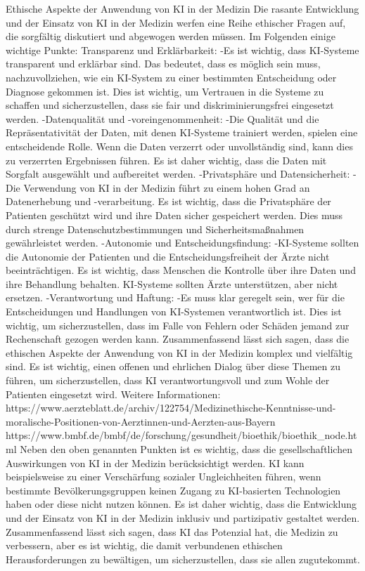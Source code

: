 \documentclass{article}
\begin{document}
{    Ethische Aspekte der Anwendung von KI in der Medizin
    Die rasante Entwicklung und der Einsatz von KI in der Medizin werfen eine Reihe ethischer Fragen auf, die sorgfältig diskutiert und abgewogen werden müssen. Im Folgenden einige wichtige Punkte:
    Transparenz und Erklärbarkeit:
    -Es ist wichtig, dass KI-Systeme transparent und erklärbar sind. Das bedeutet, dass es möglich sein muss, nachzuvollziehen, wie ein KI-System zu einer bestimmten Entscheidung oder Diagnose gekommen ist. Dies ist wichtig, um Vertrauen in die Systeme zu schaffen und sicherzustellen, dass sie fair und diskriminierungsfrei eingesetzt werden.
    -Datenqualität und -voreingenommenheit:
    -Die Qualität und die Repräsentativität der Daten, mit denen KI-Systeme trainiert werden, spielen eine entscheidende Rolle. Wenn die Daten verzerrt oder unvollständig sind, kann dies zu verzerrten Ergebnissen führen. Es ist daher wichtig, dass die Daten mit Sorgfalt ausgewählt und aufbereitet werden.
    -Privatsphäre und Datensicherheit:
    -Die Verwendung von KI in der Medizin führt zu einem hohen Grad an Datenerhebung und -verarbeitung. Es ist wichtig, dass die Privatsphäre der Patienten geschützt wird und ihre Daten sicher gespeichert werden. Dies muss durch strenge Datenschutzbestimmungen und Sicherheitsmaßnahmen gewährleistet werden.
    -Autonomie und Entscheidungsfindung:
    -KI-Systeme sollten die Autonomie der Patienten und die Entscheidungsfreiheit der Ärzte nicht beeinträchtigen. Es ist wichtig, dass Menschen die Kontrolle über ihre Daten und ihre Behandlung behalten. KI-Systeme sollten Ärzte unterstützen, aber nicht ersetzen.
    -Verantwortung und Haftung:
    -Es muss klar geregelt sein, wer für die Entscheidungen und Handlungen von KI-Systemen verantwortlich ist. Dies ist wichtig, um sicherzustellen, dass im Falle von Fehlern oder Schäden jemand zur Rechenschaft gezogen werden kann.
    Zusammenfassend lässt sich sagen, dass die ethischen Aspekte der Anwendung von KI in der Medizin komplex und vielfältig sind. Es ist wichtig, einen offenen und ehrlichen Dialog über diese Themen zu führen, um sicherzustellen, dass KI verantwortungsvoll und zum Wohle der Patienten eingesetzt wird.
    Weitere Informationen:
    https://www.aerzteblatt.de/archiv/122754/Medizinethische-Kenntnisse-und-moralische-Positionen-von-Aerztinnen-und-Aerzten-aus-Bayern
    https://www.bmbf.de/bmbf/de/forschung/gesundheit/bioethik/bioethik_node.html
    Neben den oben genannten Punkten ist es wichtig, dass die gesellschaftlichen Auswirkungen von KI in der Medizin berücksichtigt werden. KI kann beispielsweise zu einer Verschärfung sozialer Ungleichheiten führen, wenn bestimmte Bevölkerungsgruppen keinen Zugang zu KI-basierten Technologien haben oder diese nicht nutzen können. Es ist daher wichtig, dass die Entwicklung und der Einsatz von KI in der Medizin inklusiv und partizipativ gestaltet werden.
    Zusammenfassend lässt sich sagen, dass KI das Potenzial hat, die Medizin zu verbessern, aber es ist wichtig, die damit verbundenen ethischen Herausforderungen zu bewältigen, um sicherzustellen, dass sie allen zugutekommt.
    
}

\tableofcontents



\printbibliography
\end{document}
